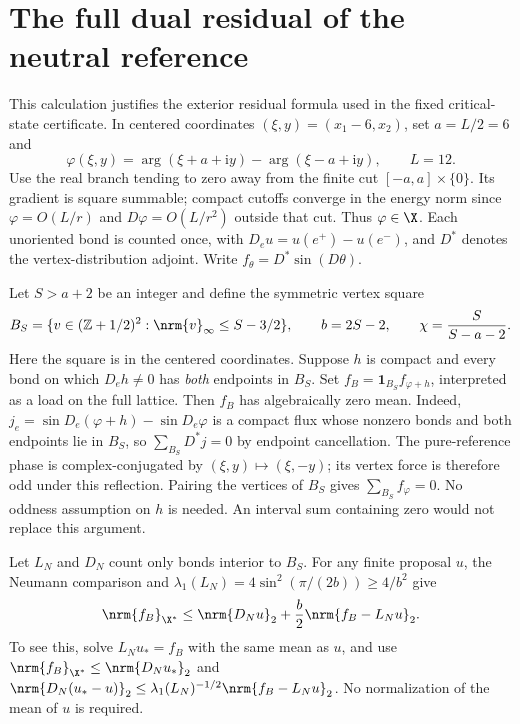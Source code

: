 \section{The full dual residual of the neutral reference}
\label{app:reflected-residual}

This calculation justifies the exterior residual formula used in the
fixed critical-state certificate. In centered coordinates
$(\xi,y)=(x_1-6,x_2)$, set $a=L/2=6$ and
\[
 \varphi(\xi,y)=\arg(\xi+a+\mathrm i y)
                  -\arg(\xi-a+\mathrm i y),\qquad L=12.
\]
Use the real branch tending to zero away from the finite cut
$[-a,a]\times\{0\}$. Its gradient is square summable; compact cutoffs
converge in the energy norm since $\varphi=O(L/r)$ and
$D\varphi=O(L/r^2)$ outside that cut. Thus $\varphi\in\X$.
Each unoriented bond is counted once, with
$D_eu=u(e^+)-u(e^-)$, and $D^*$ denotes the vertex-distribution adjoint.
Write $f_\theta=D^*\sin(D\theta)$.

Let $S>a+2$ be an integer and define the symmetric vertex square
\[
 B_S=\{v\in(\mathbb Z+1/2)^2:\nrm{v}_\infty\le S-3/2\},
 \qquad b=2S-2,\qquad \chi=\frac{S}{S-a-2}.
\]
Here the square is in the centered coordinates. Suppose $h$ is compact
and every bond on which $D_eh\ne0$ has \emph{both} endpoints in $B_S$.
Set $f_B=\mathbf1_{B_S}f_{\varphi+h}$, interpreted as a load on the
full lattice. Then $f_B$ has algebraically zero mean. Indeed,
$j_e=\sin D_e(\varphi+h)-\sin D_e\varphi$ is a compact flux whose
nonzero bonds and both endpoints lie in $B_S$, so
$\sum_{B_S}D^*j=0$ by endpoint cancellation. The pure-reference phase is
complex-conjugated by $(\xi,y)\mapsto(\xi,-y)$; its vertex force is
therefore odd under this reflection. Pairing the vertices of $B_S$
gives $\sum_{B_S}f_\varphi=0$. No oddness assumption on $h$ is needed.
An interval sum containing zero would not replace this argument.

Let $L_N$ and $D_N$ count only bonds interior to $B_S$. For any finite
proposal $u$, the Neumann comparison and
$\lambda_1(L_N)=4\sin^2(\pi/(2b))\ge4/b^2$ give
\begin{equation}
 \nrm{f_B}_{\X^*}
 \le \nrm{D_Nu}_2+\frac b2\nrm{f_B-L_Nu}_2.
 \label{eq:finite-residual-energy}
\end{equation}
To see this, solve $L_Nu_*=f_B$ with the same mean as $u$, and use
$\nrm{f_B}_{\X^*}\le\nrm{D_Nu_*}_2$ and
$\nrm{D_N(u_*-u)}_2\le\lambda_1(L_N)^{-1/2}
\nrm{f_B-L_Nu}_2$. No normalization of the mean of $u$ is required.

